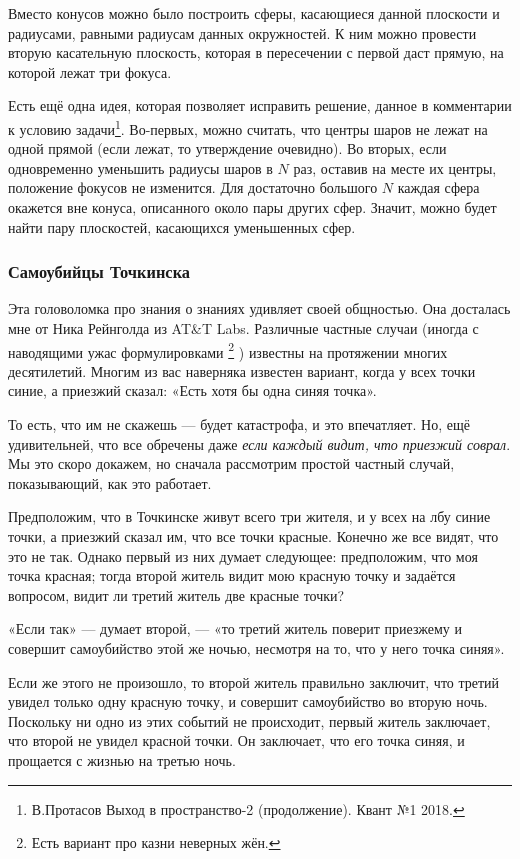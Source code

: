 \begin{addedbytheeditors}
Вместо конусов можно было построить сферы, касающиеся данной плоскости и радиусами, равными радиусам данных окружностей. К ним можно провести вторую касательную плоскость, которая в пересечении с первой даст прямую, на которой лежат три фокуса.

Есть ещё одна идея, которая позволяет исправить решение, данное в комментарии к условию задачи\footnote{В.Протасов Выход в пространство-2 (продолжение). Квант №1 2018.}.
Во-первых, можно считать, что центры
шаров не лежат на одной прямой (если
лежат, то утверждение очевидно). Во вторых, если одновременно уменьшить радиусы шаров в $N$ раз, оставив на месте их
центры, положение фокусов не изменится. Для достаточно большого $N$ каждая сфера окажется вне конуса, описанного около  пары других сфер. Значит, можно будет найти пару плоскостей, касающихся уменьшенных сфер. 
\pr
\end{addedbytheeditors}

\subsubsection*{Самоубийцы Точкинска}

Эта головоломка про знания о знаниях удивляет своей общностью.
Она досталась мне от Ника Рейнголда из AT\&T Labs.
Различные частные случаи (иногда с наводящими ужас формулировками%
\footnote{Есть вариант про казни неверных жён.\pr}%
) известны на протяжении многих десятилетий.
Многим из вас наверняка известен вариант, когда у всех точки синие, а приезжий сказал: «Есть хотя бы одна синяя точка».

То есть, что им не скажешь --- будет катастрофа, и это впечатляет.
Но, ещё удивительней, что все обречены даже \emph{если каждый видит, что приезжий соврал}. 
Мы это скоро докажем, но сначала рассмотрим простой частный случай, показывающий, как это работает.

Предположим, что в Точкинске живут всего три жителя, и у всех на лбу синие точки, а приезжий сказал им, что все точки красные.
Конечно же все видят, что это не так.
Однако первый из них думает следующее: предположим, что моя точка красная; тогда второй житель видит мою красную точку и задаётся вопросом, видит ли третий житель две красные точки?

«Если так» --- думает второй, --- «то третий житель поверит приезжему и совершит самоубийство этой же ночью, несмотря на то, что у него точка синяя».

Если же этого не произошло, то второй житель правильно заключит, что третий увидел только одну красную точку, и совершит самоубийство во вторую ночь.
Поскольку ни одно из этих событий не происходит, первый житель заключает, что второй не увидел красной точки.
Он заключает, что его точка синяя, и прощается с жизнью на третью ночь.


